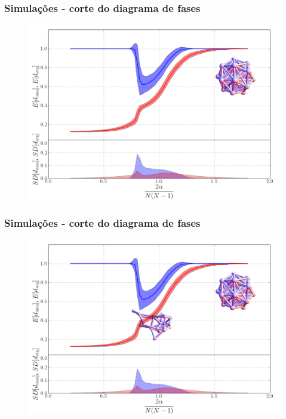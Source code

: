 \documentclass[ignorenonframetext,]{beamer}
\makeatletter
\def\ScaleIfNeededV{%
  \ifdim\Gin@nat@width>0.9\linewidth
    0.9\linewidth
  \else
    \Gin@nat@width
  \fi
}
\def\ScaleIfNeededH{%
  \ifdim\Gin@nat@height>0.9\textheight
    0.9\textheight
  \else
    \Gin@nat@height
  \fi
}
\let\Oldincludegraphics\includegraphics
\renewcommand{\includegraphics}[2][]{\Oldincludegraphics[width=\ScaleIfNeededV,height=\ScaleIfNeededH,keepaspectratio]{#2}}
\makeatother
\begin{document}
\begin{frame}\frametitle{Simulações - corte do diagrama de fases}

\begin{figure}[htbp]
\centering
\includegraphics{./figs/cutfull.png}
\end{figure}

\end{frame}

\begin{frame}\frametitle{Simulações - corte do diagrama de fases}

\begin{figure}[htbp]
\centering
\includegraphics{./figs/cutstruggle.png}
\end{figure}

\end{frame}
\end{document}
